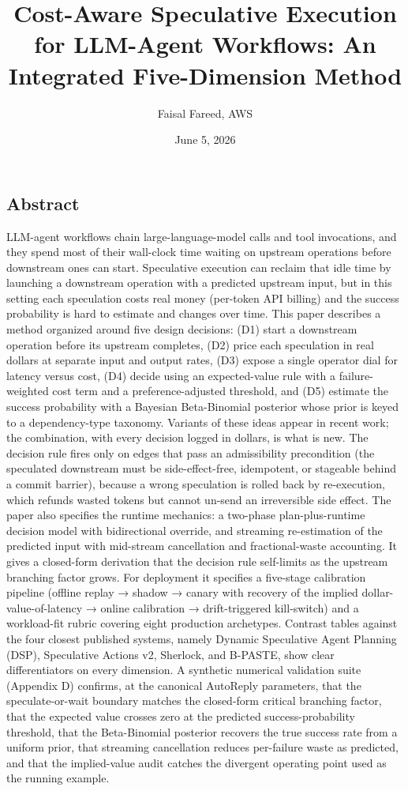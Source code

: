 \documentclass[
  11pt,
]{article}
\title{Cost-Aware Speculative Execution for LLM-Agent Workflows: An
Integrated Five-Dimension Method}
\author{Faisal Fareed, AWS}
\date{June 5, 2026}
\begin{document}
\maketitle

\subsection{Abstract}\label{abstract}

LLM-agent workflows chain large-language-model calls and tool
invocations, and they spend most of their wall-clock time waiting on
upstream operations before downstream ones can start. Speculative
execution can reclaim that idle time by launching a downstream operation
with a predicted upstream input, but in this setting each speculation
costs real money (per-token API billing) and the success probability is
hard to estimate and changes over time. This paper describes a method
organized around five design decisions: (D1) start a downstream
operation before its upstream completes, (D2) price each speculation in
real dollars at separate input and output rates, (D3) expose a single
operator dial for latency versus cost, (D4) decide using an
expected-value rule with a failure-weighted cost term and a
preference-adjusted threshold, and (D5) estimate the success probability
with a Bayesian Beta-Binomial posterior whose prior is keyed to a
dependency-type taxonomy. Variants of these ideas appear in recent work;
the combination, with every decision logged in dollars, is what is new.
The decision rule fires only on edges that pass an admissibility
precondition (the speculated downstream must be side-effect-free,
idempotent, or stageable behind a commit barrier), because a wrong
speculation is rolled back by re-execution, which refunds wasted tokens
but cannot un-send an irreversible side effect. The paper also specifies
the runtime mechanics: a two-phase plan-plus-runtime decision model with
bidirectional override, and streaming re-estimation of the predicted
input with mid-stream cancellation and fractional-waste accounting. It
gives a closed-form derivation that the decision rule self-limits as the
upstream branching factor grows. For deployment it specifies a
five-stage calibration pipeline (offline replay → shadow → canary with
recovery of the implied dollar-value-of-latency → online calibration →
drift-triggered kill-switch) and a workload-fit rubric covering eight
production archetypes. Contrast tables against the four closest
published systems, namely Dynamic Speculative Agent Planning (DSP),
Speculative Actions v2, Sherlock, and B-PASTE, show clear
differentiators on every dimension. A synthetic numerical validation
suite (Appendix D) confirms, at the canonical AutoReply parameters, that
the speculate-or-wait boundary matches the closed-form critical
branching factor, that the expected value crosses zero at the predicted
success-probability threshold, that the Beta-Binomial posterior recovers
the true success rate from a uniform prior, that streaming cancellation
reduces per-failure waste as predicted, and that the implied-value audit
catches the divergent operating point used as the running example.
\end{document}
